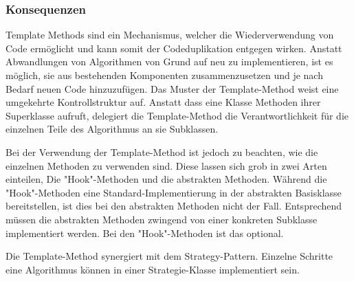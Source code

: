\subsubsection*{Konsequenzen}

Template Methods sind ein Mechanismus, welcher die Wiederverwendung von Code ermöglicht und kann somit der Codeduplikation entgegen wirken. Anstatt Abwandlungen von Algorithmen von Grund auf neu zu implementieren, ist es möglich, sie aus bestehenden Komponenten zusammenzusetzen und je nach Bedarf neuen Code hinzuzufügen. Das Muster der Template-Method weist eine umgekehrte Kontrollstruktur auf. Anstatt dass eine Klasse Methoden ihrer Superklasse aufruft, delegiert die Template-Method die Verantwortlichkeit für die einzelnen Teile des Algorithmus an sie Subklassen.

Bei der Verwendung der Template-Method ist jedoch zu beachten, wie die einzelnen Methoden zu verwenden sind. Diese lassen sich grob in zwei Arten einteilen, Die "Hook"-Methoden und die abstrakten Methoden. Während die "Hook"-Methoden eine Standard-Implementierung in der abstrakten Basisklasse bereitstellen, ist dies bei den abstrakten Methoden nicht der Fall. Entsprechend müssen die abstrakten Methoden zwingend von einer konkreten Subklasse implementiert werden. Bei den "Hook"-Methoden ist das optional. 

Die Template-Method synergiert mit dem Strategy-Pattern. Einzelne Schritte eine Algorithmus können in einer Strategie-Klasse implementiert sein.